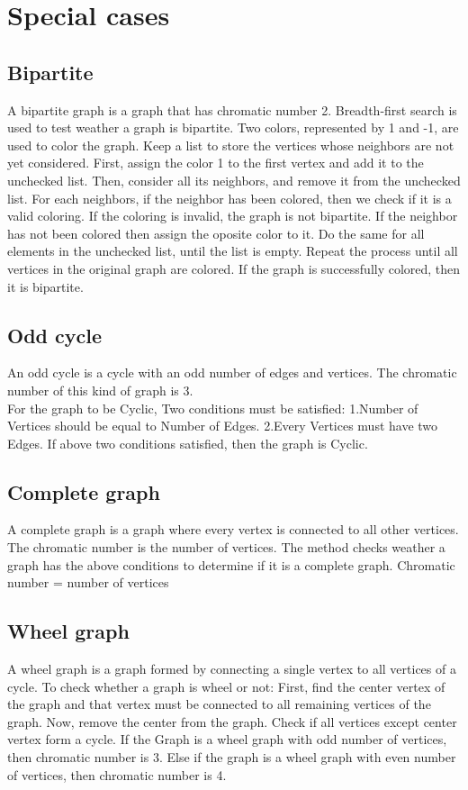 \documentclass[a4paper]{report}
\begin{document}
		\section{Special cases}
			\subsection{Bipartite}
			A bipartite graph is a graph that has chromatic number 2. Breadth-first search is used to test weather a graph is bipartite. Two colors, represented by 1 and -1, are used to color the graph. Keep a list to store the vertices whose neighbors are not yet considered. First, assign the color 1 to the first vertex and add it to the unchecked list. Then, consider all its neighbors, and remove it from the unchecked list. For each neighbors, if the neighbor has been colored, then we check if it is a valid coloring. If the coloring is invalid, the graph is not bipartite. If the neighbor has not been colored then assign the oposite color to it. Do the same for all elements in the unchecked list, until the list is empty. Repeat the process until all vertices in the original graph are colored. If the graph is successfully colored, then it is bipartite.
			\subsection{Odd cycle}
			An odd cycle is a cycle with an odd number of edges and vertices. The chromatic number of this kind of graph is 3. \\
			For the graph to be Cyclic, Two conditions must be satisfied:
			1.Number of Vertices should be equal to Number of Edges.
			2.Every Vertices must have two Edges.
			If above two conditions satisfied, then  the graph is Cyclic.
			
			\subsection{Complete graph}
			A complete graph is a graph where every vertex is connected to all other vertices. The chromatic number is the number of vertices. The method checks weather a graph has the above conditions to determine if it is a complete graph.
			Chromatic number = number of vertices
			\subsection{Wheel graph}
			A wheel graph is a graph formed by connecting a single vertex to all vertices of a cycle.
			To check whether a graph is wheel or not: First, find the center vertex of the graph and that vertex must be connected to all remaining vertices of the graph. Now, remove the  center from the graph. Check if all vertices except center vertex form a cycle.
			If the Graph is a wheel graph with odd number of vertices, then chromatic number is 3.
			Else if the graph is a wheel graph with even number of vertices, then chromatic number is 4.
			
\end{document}
